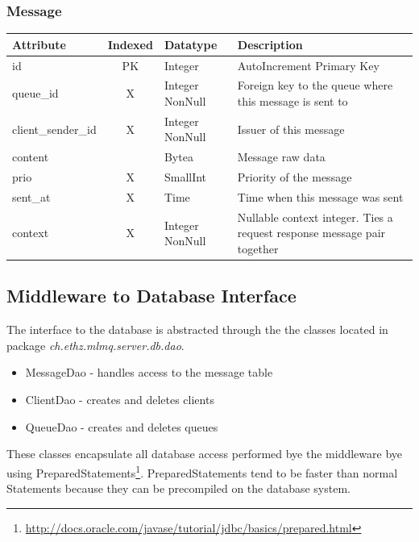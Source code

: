 \documentclass[a4paper]{article}
\begin{document}
\subsubsection{Message}
\begin{tabular}
{|>{\centering\arraybackslash}p{2.1cm}|c|>{\centering\arraybackslash}p{3cm}|p{7cm}|}
\hline 
\textbf{Attribute} & \textbf{Indexed} & \textbf{Datatype} & \textbf{Description} \\ 
\hline 
id & PK & Integer & AutoIncrement Primary Key \\ 
\hline 
queue\_id & X & Integer NonNull & Foreign key to the queue where this message is sent to\\ 
\hline 
client\_sender\_id & X & Integer NonNull & Issuer of this message \\ 
\hline 
content &  & Bytea & Message raw data \\ 
\hline 
prio & X & SmallInt & Priority of the message \\ 
\hline 
sent\_at & X & Time & Time when this message was sent \\ 
\hline 
context & X & Integer NonNull & Nullable context integer. Ties a request response message pair together \\ 
\hline 
\end{tabular} 



\subsection{Middleware to Database Interface}

The interface to the database is abstracted through the the classes located in package \textit{ch.ethz.mlmq.server.db.dao}.

\begin{itemize}
\item MessageDao - handles access to the message table
\item ClientDao - creates and deletes clients
\item QueueDao - creates and deletes queues
\end{itemize}

These classes encapsulate all database access performed bye the middleware bye using PreparedStatements\footnote{\url{http://docs.oracle.com/javase/tutorial/jdbc/basics/prepared.html}}. PreparedStatements tend to be faster than normal Statements because they can be precompiled on the database system.
\end{document}
